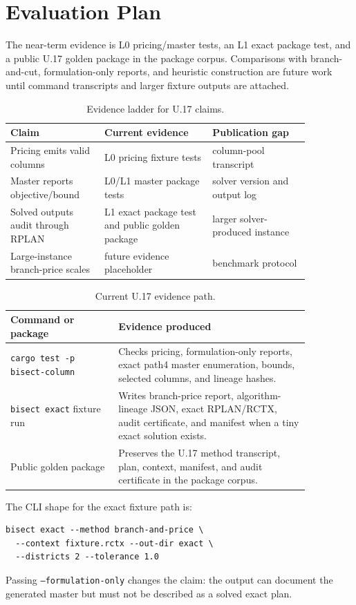 \section{Evaluation Plan}

The near-term evidence is L0 pricing/master tests, an L1 exact package test,
and a public U.17 golden package in the package corpus. Comparisons with
branch-and-cut, formulation-only reports, and heuristic construction are future
work until command transcripts and larger fixture outputs are attached.

\begin{table}[htbp]
\centering
\small
\begin{tabular}{p{0.27\linewidth}p{0.31\linewidth}p{0.28\linewidth}}
\toprule
Claim & Current evidence & Publication gap \\
\midrule
Pricing emits valid columns & L0 pricing fixture tests & column-pool transcript \\
Master reports objective/bound & L0/L1 master package tests & solver version and output log \\
Solved outputs audit through RPLAN & L1 exact package test and public golden
package & larger solver-produced instance \\
Large-instance branch-price scales & future evidence placeholder & benchmark protocol \\
\bottomrule
\end{tabular}
\caption{Evidence ladder for U.17 claims.}
\end{table}

\begin{table}[htbp]
\centering
\small
\begin{tabular}{p{0.31\linewidth}p{0.55\linewidth}}
\toprule
Command or package & Evidence produced \\
\midrule
\texttt{cargo test -p bisect-column} & Checks pricing, formulation-only
reports, exact path4 master enumeration, bounds, selected columns, and lineage
hashes. \\
\texttt{bisect exact} fixture run & Writes branch-price report,
algorithm-lineage JSON, exact RPLAN/RCTX, audit certificate, and manifest when
a tiny exact solution exists. \\
Public golden package & Preserves the U.17 method transcript, plan, context,
manifest, and audit certificate in the package corpus. \\
\bottomrule
\end{tabular}
\caption{Current U.17 evidence path.}
\end{table}

The CLI shape for the exact fixture path is:
\begin{verbatim}
bisect exact --method branch-and-price \
  --context fixture.rctx --out-dir exact \
  --districts 2 --tolerance 1.0
\end{verbatim}
Passing \texttt{--formulation-only} changes the claim: the output can document
the generated master but must not be described as a solved exact plan.
